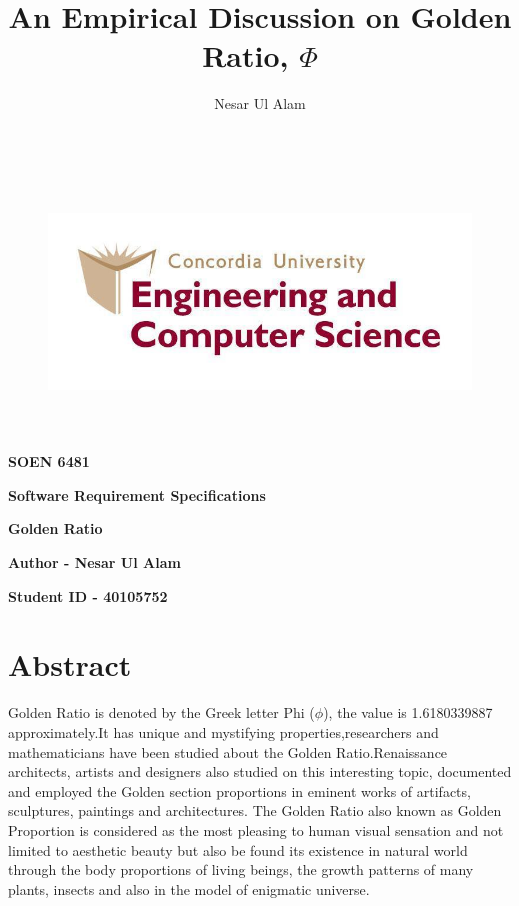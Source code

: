 \documentclass[12pt]{extarticle}
\title{An Empirical Discussion on Golden Ratio, $\Phi$}
\author{Nesar Ul Alam}
\begin{document}
\begin{figure}[h]
\centering
\includegraphics[width=16.03cm,height=6.98cm]{image1.jpeg}
\end{figure}
\textbf{ }

\begin{center}\textbf{SOEN 6481}\end{center}

\begin{center}\textbf{Software Requirement Specifications}
\end{center}

\begin{center}\textbf{Golden Ratio}\end{center}



\begin{center}\textbf{Author - Nesar Ul Alam}\end{center}

\begin{center}\textbf{Student ID - 40105752}\end{center}




\newpage
\tableofcontents

\newpage
\section{Abstract}
Golden Ratio is denoted by the Greek letter Phi ($\phi$), the value is 1.6180339887 approximately.It has unique and mystifying properties,researchers
and mathematicians have been studied about the Golden Ratio.Renaissance architects,
artists and designers also studied on this interesting topic, documented and employed the Golden section proportions in
eminent works of artifacts, sculptures, paintings and architectures. The Golden Ratio also known as Golden Proportion is considered as the most pleasing
to human visual sensation and not limited to aesthetic beauty but also be found its existence in natural world through the body
proportions of living beings, the growth patterns of many plants, insects and also in the model of enigmatic universe. \cite{geometricalphi}
\newpage
\end{document}
